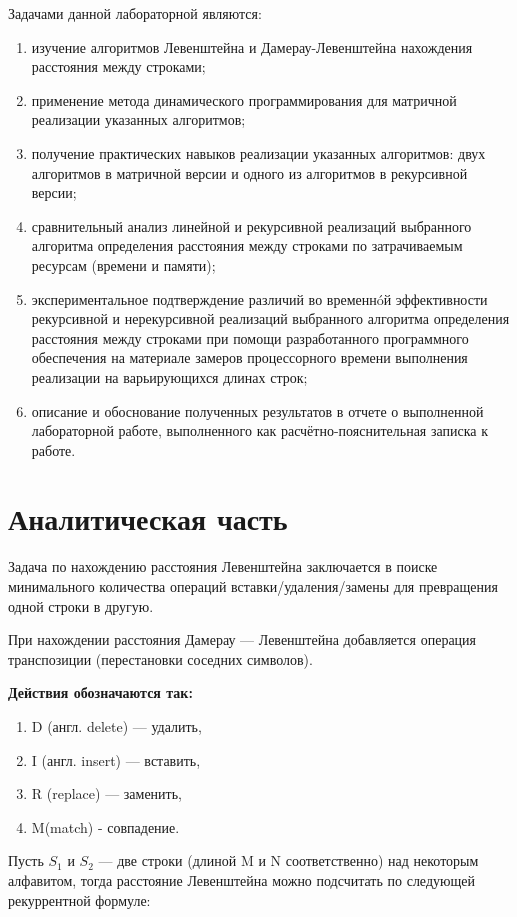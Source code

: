 \documentclass[12pt]{report}
\begin{document}
Задачами данной лабораторной являются:
\begin{enumerate}
  	\item изучение алгоритмов Левенштейна и Дамерау-Левенштейна нахождения расстояния между строками;
	\item применение метода динамического программирования для матричной реализации указанных алгоритмов; 
	\item получение практических навыков реализации указанных алгоритмов: двух алгоритмов в матричной версии и одного из алгоритмов в рекурсивной версии; 
	\item сравнительный анализ линейной и рекурсивной реализаций выбранного алгоритма определения расстояния между строками по затрачиваемым ресурсам (времени и памяти); 
	\item экспериментальное подтверждение различий во временнóй эффективности рекурсивной и
нерекурсивной реализаций выбранного алгоритма определения расстояния между строками при
помощи разработанного программного обеспечения на материале замеров процессорного времени
выполнения реализации на варьирующихся длинах строк; 
	\item описание и обоснование полученных результатов в отчете о выполненной лабораторной
работе, выполненного как расчётно-пояснительная записка к работе. 
\end{enumerate}


\chapter{Аналитическая часть}
Задача по нахождению расстояния Левенштейна заключается в поиске минимального количества операций вставки/удаления/замены для превращения одной строки в другую.

При нахождении расстояния Дамерау — Левенштейна добавляется операция транспозиции (перестановки соседних символов).  
 
\textbf{Действия обозначаются так:} 
\begin{enumerate}
  	\item D (англ. delete) — удалить,
	\item I (англ. insert) — вставить,
	\item R (replace) — заменить,
	\item M(match) - совпадение.
\end{enumerate}

Пусть $S_{1}$ и $S_{2}$ — две строки (длиной M и N соответственно) над некоторым алфавитом, тогда расстояние Левенштейна можно подсчитать по следующей рекуррентной формуле:
\end{document}
